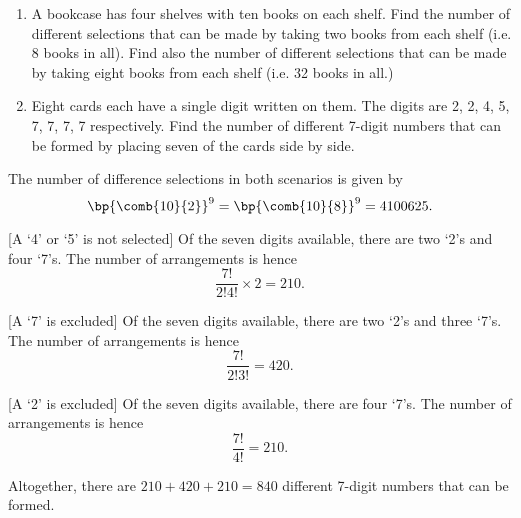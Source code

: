 \begin{problem}
    \begin{enumerate}
        \item A bookcase has four shelves with ten books on each shelf. Find the number of different selections that can be made by taking two books from each shelf (i.e. 8 books in all). Find also the number of different selections that can be made by taking eight books from each shelf (i.e. 32 books in all.)
        \item Eight cards each have a single digit written on them. The digits are 2, 2, 4, 5, 7, 7, 7, 7 respectively. Find the number of different 7-digit numbers that can be formed by placing seven of the cards side by side.
    \end{enumerate}
\end{problem}
\begin{solution}
    \begin{ppart}
        The number of difference selections in both scenarios is given by \[\bp{\comb{10}{2}}^9 = \bp{\comb{10}{8}}^9 = 4100625.\]
    \end{ppart}
    \begin{ppart}
        \phantom{.}
    
        [A `4' or `5' is not selected] Of the seven digits available, there are two `2's and four `7's. The number of arrangements is hence \[\frac{7!}{2! 4!} \times 2 = 210.\]

        [A `7' is excluded] Of the seven digits available, there are two `2's and three `7's. The number of arrangements is hence \[\frac{7!}{2! 3!} = 420.\]

        [A `2' is excluded] Of the seven digits available, there are four `7's. The number of arrangements is hence \[\frac{7!}{4!} = 210.\]

        Altogether, there are $210 + 420 + 210 = 840$ different 7-digit numbers that can be formed.
    \end{ppart}
\end{solution}


